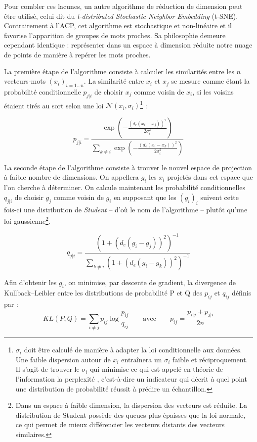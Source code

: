 \documentclass[11pt,french,french]{article}
\let\rmarkdownfootnote\footnote%
\def\footnote{\protect\rmarkdownfootnote}
\begin{document}
Pour combler ces lacunes, un autre algorithme de réduction de dimension peut être utilisé, celui dit du \emph{t-distributed Stochastic Neighbor Embedding} (t-SNE).
Contrairement à l'ACP, cet algorithme est stochastique et non-linéaire et il favorise l'apparition de groupes de mots proches.
Sa philosophie demeure cependant identique : représenter dans un espace à dimension réduite notre nuage de points de manière à repérer les mots proches.

La première étape de l'algorithme consiste à calculer les similarités entre les \(n\) vecteurs-mots \((x_i)_{i=1...n}\). La similarité entre \(x_i\) et \(x_j\) se mesure comme étant la probabilité conditionnelle \(p_{j|i}\) de choisir \(x_j\) comme voisin de \(x_i\), si les voisins étaient tirés au sort selon une loi \(\mathcal{N}(x_i, \sigma_i)\)\footnote{\(\sigma_i\) doit être calculé de manière à adapter la loi conditionnelle aux données.
  Une faible dispersion autour de \(x_i\) entraînera un \(\sigma_i\) faible et réciproquement.
  Il s'agit de trouver le \(\sigma_i\) qui minimise ce qui est appelé en théorie de l'information la \og perplexité \fg{}, c'est-à-dire un indicateur qui décrit à quel point une distribution de probabilité réussit à prédire un échantillon.} :

\[ p_{j|i} = \frac{
\exp\left(-\frac{(d_e(x_i - x_j))^2}{2\sigma_i^2}\right)
}{
\sum_{k \neq i}
\exp\left(-\frac{(d_e(x_i - x_k))^2}{2\sigma_i^2}\right)
}\]

La seconde étape de l'algorithme consiste à trouver le nouvel espace de projection à faible nombre de dimensions.
On appellera \(g_i\) les \(x_i\) projetés dans cet espace que l'on cherche à déterminer.
On calcule maintenant les probabilité conditionnelles \(q_{j|i}\) de choisir \(g_j\) comme voisin de \(g_i\) en supposant que les \((g_i)_i\) suivent cette fois-ci une distribution de \emph{Student} -- d'où le nom de l'algorithme -- plutôt qu'une loi gaussienne\footnote{Dans un espace à faible dimension, la dispersion des vecteurs est réduite.
  La distribution de Student possède des queues plus épaisses que la loi normale, ce qui permet de mieux différencier les vecteurs distants des vecteurs similaires.}.

\[ q_{j|i} = \frac{(1+ (d_e(g_i - g_j))^2)^{-1}}{\sum_{k \neq i}{(1+ (d_e(g_i - g_k))^2)^{-1}}}\]

Afin d'obtenir les \(g_i\), on minimise, par descente de gradient, la divergence de Kullback--Leibler entre les distributions de probabilité P et Q des \(p_{ij}\) et \(q_{ij}\) définis par :
\[KL(P,Q) = \sum_{i \neq j} { p_{ij} \log{\frac{p_{ij}}{q_{ij}}}} \qquad\text{avec}\qquad p_{ij} = \frac{p_{i|j} + p_{j|i}}{2n}\]
\end{document}
